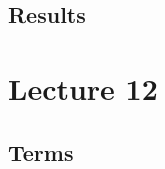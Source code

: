 \documentclass[10pt]{article}
\begin{document}

\subsection{Results}



\section{Lecture 12}

\subsection{Terms}
\end{document}
